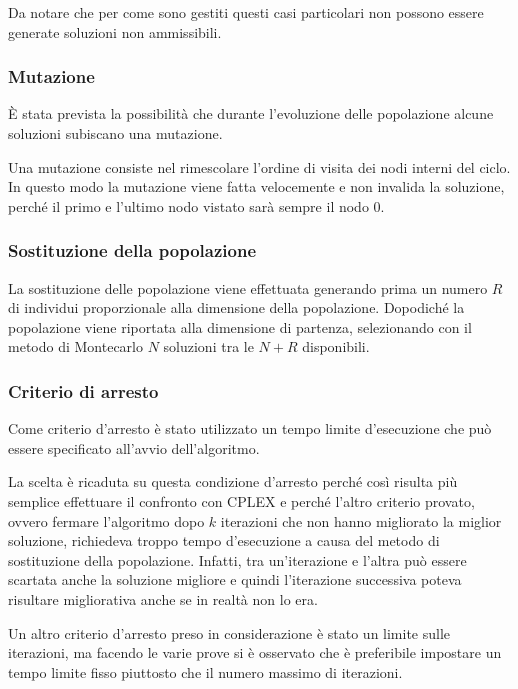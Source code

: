 Da notare che per come sono gestiti questi casi particolari non possono essere generate soluzioni non ammissibili.

\subsubsection{Mutazione}

\`E stata prevista la possibilità che durante l'evoluzione delle popolazione alcune soluzioni subiscano una mutazione.

Una mutazione consiste nel rimescolare l'ordine di visita dei nodi interni del ciclo. In questo modo la mutazione viene fatta velocemente e non invalida la soluzione, perché il primo e l'ultimo nodo vistato sarà sempre il nodo 0.

\subsubsection{Sostituzione della popolazione}

La sostituzione delle popolazione viene effettuata generando prima un numero $R$ di individui proporzionale alla dimensione della popolazione. Dopodiché la popolazione viene riportata alla dimensione di partenza, selezionando con il metodo di Montecarlo $N$ soluzioni tra le $N+R$ disponibili.

\subsubsection{Criterio di arresto}

Come criterio d'arresto è stato utilizzato un tempo limite d'esecuzione che può essere specificato all'avvio dell'algoritmo.

La scelta è ricaduta su questa condizione d'arresto perché così risulta più semplice effettuare il confronto con CPLEX e perché l'altro criterio provato, ovvero fermare l'algoritmo dopo $k$ iterazioni che non hanno migliorato la miglior soluzione, richiedeva troppo tempo d'esecuzione a causa del metodo di sostituzione della popolazione.
Infatti, tra un'iterazione e l'altra può essere scartata anche la soluzione migliore e quindi l'iterazione successiva poteva risultare migliorativa anche se in realtà non lo era.

Un altro criterio d'arresto preso in considerazione è stato un limite sulle iterazioni, ma facendo le varie prove si è osservato che è preferibile impostare un tempo limite fisso piuttosto che il numero massimo di iterazioni.

